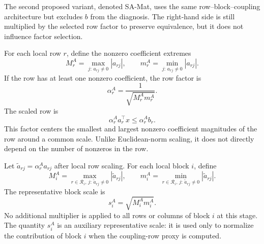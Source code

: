 \documentclass[AMA,Times1COL]{WileyNJDv5} %
\newcommand{\abs}[1]{\left\lvert #1 \right\rvert}
\newcommand{\methodMat}{SA-Mat}
\providecommand{\DIFaddbegin}{} %
\providecommand{\DIFaddend}{} %
\providecommand{\DIFdelbegin}{} %
\providecommand{\DIFdelend}{} %
\begin{document}
The second proposed variant, denoted \methodMat{}, uses the same row--block--coupling
architecture but excludes $b$ from the diagnosis. The right-hand side is still multiplied
by the selected row factor to preserve equivalence, but it does not influence factor
selection.

For each local row $r$, define the nonzero coefficient extremes
\begin{equation}
M_r^{A}=\max_{j:\,a_{rj}\neq 0}\abs{a_{rj}},
\qquad
m_r^{A}=\min_{j:\,a_{rj}\neq 0}\abs{a_{rj}}.
\label{eq:matrix-row-extremes}
\end{equation}
If the row has at least one nonzero coefficient, the row factor is
\begin{equation}
\alpha_r^{A}=\frac{1}{\sqrt{M_r^{A}m_r^{A}}}.
\label{eq:matrix-row-factor}
\end{equation}
The scaled row is
\begin{equation}
\alpha_r^{A}a_r^\top x\le \alpha_r^{A}b_r.
\end{equation}
This factor centers the smallest and largest nonzero coefficient magnitudes of the row
around a common scale. Unlike Euclidean-norm scaling, it does not directly depend on
the number of nonzeros in the row.

Let $\widetilde a_{rj}=\alpha_r^A a_{rj}$ after local row scaling. For each local block
$i$, define
\DIFdelbegin %
\DIFdelend \DIFaddbegin \begin{equation}
M_i^{A}
=
\max_{r\in\mathcal{R}_i,\,j:\,\widetilde a_{rj}\neq 0}
\abs{\widetilde a_{rj}},
\qquad
m_i^{A}
=
\min_{r\in\mathcal{R}_i,\,j:\,\widetilde a_{rj}\neq 0}
\abs{\widetilde a_{rj}}.
\label{eq:matrix-block-extremes}
\end{equation}\DIFaddend 
The representative block scale is
\begin{equation}
s_i^A=\sqrt{M_i^A m_i^A}.
\label{eq:matrix-block-scale}
\end{equation}
No additional multiplier is applied to all rows or columns of block $i$ at this stage.
The quantity $s_i^A$ is an auxiliary representative scale: it is used only to
normalize the contribution of block $i$ when the coupling-row proxy is computed.
\end{document}
